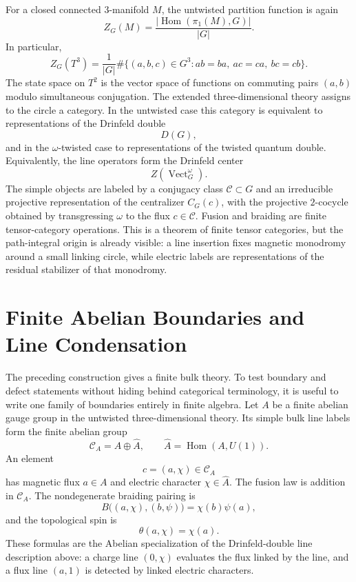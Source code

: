 For a closed connected \(3\)-manifold \(M\), the untwisted partition function
is again
\[
  Z_G(M)=\frac{|\operatorname{Hom}(\pi_1(M),G)|}{|G|}.
\]
In particular,
\begin{equation}
  Z_G(T^3)
  =
  \frac{1}{|G|}
  \#\{(a,b,c)\in G^3:
  ab=ba,\ ac=ca,\ bc=cb\}.
  \label{eq:finite-gauge-t3-partition}
\end{equation}
The state space on \(T^2\) is the vector space of functions on commuting
pairs \((a,b)\) modulo simultaneous conjugation.  The extended
three-dimensional theory assigns to the circle a category.  In the untwisted
case this category is equivalent to representations of the Drinfeld double
\[
  D(G),
\]
and in the \(\omega\)-twisted case to representations of the twisted quantum
double.  Equivalently, the line operators form the Drinfeld center
\[
  Z(\operatorname{Vect}^{\omega}_G).
\]
The simple objects are labeled by a conjugacy class \(\mathcal C\subset G\)
and an irreducible projective representation of the centralizer \(C_G(c)\),
with the projective \(2\)-cocycle obtained by transgressing \(\omega\) to the
flux \(c\in\mathcal C\).  Fusion and braiding are finite tensor-category
operations.  This is a theorem of finite tensor categories, but the
path-integral origin is already visible: a line insertion fixes magnetic
monodromy around a small linking circle, while electric labels are
representations of the residual stabilizer of that monodromy.

\section{Finite Abelian Boundaries and Line Condensation}
\label{sec:finite-abelian-boundaries-line-condensation}

The preceding construction gives a finite bulk theory.  To test boundary and
defect statements without hiding behind categorical terminology, it is useful
to write one family of boundaries entirely in finite algebra.  Let \(A\) be a
finite abelian gauge group in the untwisted three-dimensional theory.  Its
simple bulk line labels form the finite abelian group
\[
  \mathcal C_A=A\oplus\widehat A,
  \qquad
  \widehat A=\operatorname{Hom}(A,U(1)).
\]
An element
\[
  c=(a,\chi)\in\mathcal C_A
\]
has magnetic flux \(a\in A\) and electric character \(\chi\in\widehat A\).
The fusion law is addition in \(\mathcal C_A\).  The nondegenerate braiding
pairing is
\begin{equation}
  B\bigl((a,\chi),(b,\psi)\bigr)
  =
  \chi(b)\psi(a),
  \label{eq:finite-abelian-double-braiding}
\end{equation}
and the topological spin is
\begin{equation}
  \theta(a,\chi)=\chi(a).
  \label{eq:finite-abelian-double-spin}
\end{equation}
These formulas are the Abelian specialization of the Drinfeld-double line
description above: a charge line \((0,\chi)\) evaluates the flux linked by
the line, and a flux line \((a,1)\) is detected by linked electric
characters.

